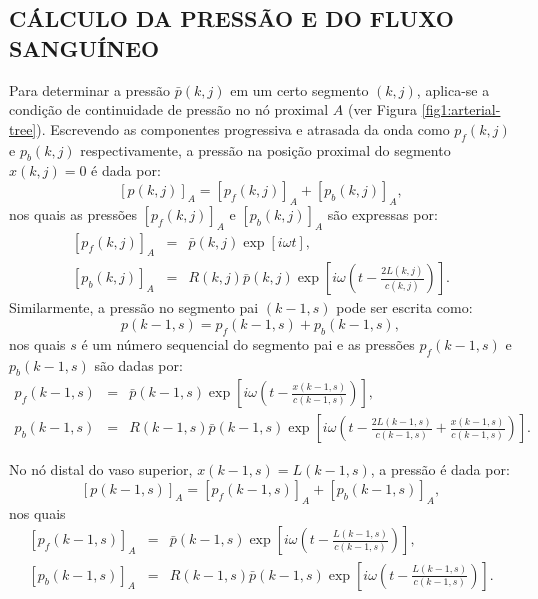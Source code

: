 \documentclass[a4paper,12pt]{monografia}
\theoremstyle{plain}
\theoremstyle{definition}
\theoremstyle{remark}
\begin{document}
\subsection{CÁLCULO DA PRESSÃO E DO FLUXO SANGUÍNEO}\label{sec:pressao-fluxo}

Para determinar a pressão $\bar{p} (k,j)$ em um certo segmento $(k,j)$, aplica-se a condição de continuidade de pressão no nó proximal $A$ (ver Figura \ref{fig1:arterial-tree}). Escrevendo as componentes progressiva e atrasada da onda como $p_f (k,j)$ e $p_b (k,j)$ respectivamente, a pressão na posição proximal do segmento  $x(k,j) = 0$ é dada por:
\begin{equation}
	\left[ p (k,j) \right]_A = \left[ p_f (k,j) \right]_A + \left[ p_b (k,j)\right]_A,
	\label{09_p}
\end{equation}
nos quais as pressões $\left[ p_f(k,j) \right]_A$ e $\left[ p_b(k,j) \right]_A$ são expressas por:
\begin{eqnarray}
	\left[ p_f(k,j) \right]_A &=& \bar{p}(k,j)\exp\left[ i\omega t\right],
	\label{10_p_f}\\
	\left[ p_b (k,j) \right]_A &=& R(k,j)\bar{p}(k,j)\exp\left[i\omega \left(t - \frac{2L(k,j)}{c(k,j)}\right) \right].
	\label{11_p_b}
\end{eqnarray}
Similarmente, a pressão no segmento pai $(k-1,s)$ pode ser escrita como:
\begin{equation}
	p(k-1,s) =  p_f(k-1,s) + p_b (k-1,s),
	\label{12_p|_f}
\end{equation}
nos quais $s$ é um número sequencial do segmento pai e as pressões $ p_f (k-1,s)$ e $p_b (k-1,s)$ são dadas por:
\begin{eqnarray}
	p_f (k-1,s) &=& \bar{p}(k-1,s)\exp\left[i\omega \left(t - \frac{x(k-1,s)}{c (k-1,s)}\right) \right],\\
	\label{13_p_f}
	p_b (k-1,s) &=& R (k-1,s)\bar{p}(k-1,s)\exp\left[ i\omega \left( t - \frac{2L(k-1,s)}{c(k-1,s)} + \frac{x(k-1,s)}{c(k-1,s)}\right) \right]. \nonumber
\end{eqnarray}

No nó distal do vaso superior, $x(k-1,s) = L(k-1,s)$, a pressão é dada por:
\begin{equation}
	\left[ p(k-1,s) \right]_A = \left[ p_f(k-1,s)\right]_A + \left[ p_b(k-1,s) \right]_A,
	\label{13_p|_f}
\end{equation}
nos quais 
\begin{eqnarray}
	\left[ p_f(k-1,s) \right]_A &=& \bar{p}(k-1,s)\exp\left[ i\omega \left(t - \frac{L(k-1,s)}{c(k-1,s)}\right)\right],
	\label{15_p_f}
	\\
	\left[ p_b(k-1,s) \right]_A &=& R(k-1,s)\bar{p}(k-1,s)\exp\left[i\omega \left( t - \frac{L(k-1,s)}{c(k-1,s)} \right) \right]. 
	\label{16_p_b}
\end{eqnarray}
\end{document}
